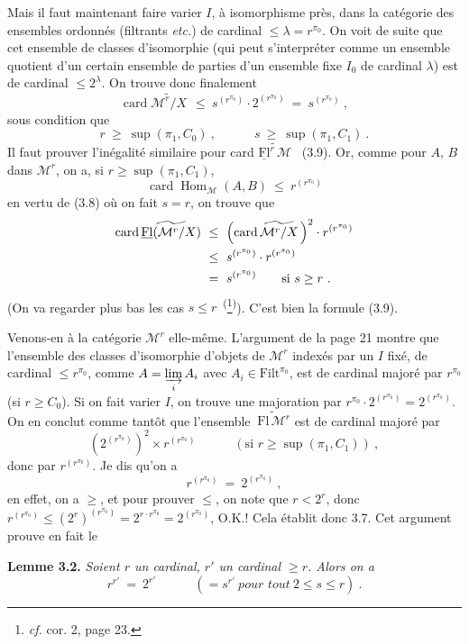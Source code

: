 \documentclass[11pt]{article}
\newcommand{\printedpage}[1]{\marginpar{\footnotesize p.~#1}}
\newcommand{\msp}[1]{\marginpar{\footnotesize [#1]}}
\newcommand{\M}{\mathcal{M}}
\newcommand{\Filt}{\mathrm{Filt}}
\newcommand{\Fl}{\mathrm{Fl}}
\newcommand{\uFl}{\underline{\mathrm{Fl}}}
\newcommand{\card}{\operatorname{card}}
\newcommand{\Hom}{\operatorname{Hom}}
\newcommand{\wavy}[1]{\widetilde{#1}}
\begin{document}
Mais il faut maintenant faire varier $I$, à isomorphisme près, dans la catégorie des ensembles ordonnés (filtrants \textit{etc.}) de cardinal $\leq\lambda=r^{\pi_0}$. On voit de suite que cet ensemble de classes d'isomorphie (qui peut s'interpréter comme un ensemble quotient d'un certain ensemble de parties d'un ensemble fixe $I_0$ de cardinal $\lambda$) est de cardinal $\leq 2^\lambda$. On trouve donc finalement
\[
\card\wavy{\M^r/X}\ \ \leq\ s^{(r^{\pi_0})}\cdot 2^{(r^{\pi_0})}\ =\ s^{(r^{\pi_0})}\ ,
\]
sous condition que
\[
r\ \geq\ \sup(\pi_1,C_0)\ ,\qquad\quad s\ \geq\ \sup(\pi_1,C_1)\ .
\]
Il faut prouver l'inégalité similaire pour card $\wavy{\uFl^r\,\M}$ \ (3.9). Or, comme pour $A$, $B$ dans $\M^r$, on a, si $r\geq\sup(\pi_1,C_1)$,
\[
\card\Hom_{\M}(A,B)\ \leq\ r^{(r^{\pi_0})}
\]
en vertu de (3.8) où on fait $s=r$, on trouve que
\[
\begin{aligned}
\card\wavy{\uFl(\M^r/X)}\ &\leq\ \Bigl(\card\wavy{\M^r/X}\,\Bigr)^2\cdot r^{(r^{\pi_0})}\\
&\leq\ s^{(r^{\pi_0})}\cdot r^{(r^{\pi_0})}\\
&=\ s^{(r^{\pi_0})}\qquad\text{si } s\geq r\ .
\end{aligned}
\]
(On va regarder plus bas les cas $s\leq r$~\textsuperscript{(}\footnote[8]{\textit{cf.} cor. 2, page 23.}\textsuperscript{)}). C'est bien la formule (3.9).

\printedpage{16}
\msp{page 23}
Venons-en à la catégorie $\M^r$ elle-même. L'argument de la page 21 montre que l'ensemble des classes d'isomorphie d'objets de $\M^r$ indexés par un $I$ fixé, de cardinal $\leq r^{\pi_0}$, comme $A=\varinjlim\limits_i A_i$ avec $A_i\in\Filt^{\pi_0}$, est de cardinal majoré par $r^{\pi_0}$ (si $r\geq C_0$). Si on fait varier $I$, on trouve une majoration par $r^{\pi_0}\cdot 2^{(r^{\pi_0})}=2^{(r^{\pi_0})}$. On en conclut comme tantôt que l'ensemble $\ \wavy{\Fl\,\M^r}$ est de cardinal majoré par
\[
(2^{(r^{\pi_0})})^2\times r^{(r^{\pi_0})}\qquad\quad(\text{si } r\geq\sup(\pi_1,C_1))\ ,
\]
donc par $r^{(r^{\pi_0})}$. Je dis qu'on a
\[
r^{(r^{\pi_0})}\ =\ 2^{(r^{\pi_0})}\ ,
\]
en effet, on a $\geq$, et pour prouver $\leq$, on note que $r<2^r$, donc $r^{(r^{\pi_0})}\leq(2^r)^{(r^{\pi_0})}=2^{r\cdot r^{\pi_0}}=2^{(r^{\pi_0})}$, O.K.! Cela établit donc 3.7. Cet argument prouve en fait le

\textbf{Lemme 3.2.} \textit{Soient $r$ un cardinal, $r'$ un cardinal $\geq r$. Alors on a}
\[
r^{r'}\ =\ 2^{r'}\qquad\quad(=s^{r'}\ \textit{pour tout}\ 2\leq s\leq r)\ .
\]
\end{document}
